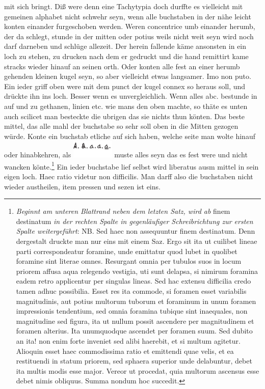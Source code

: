             \protect{} mit sich bringt. Diß were denn eine Tachytypia\protect{} doch durffte es vielleicht mit gemeinen alphabet nicht schwehr seyn, wenn alle buchstaben in der n\"{a}he leicht konten einander furgeschoben werden. Weren concentrice umb einander herumb, der da schlegt, stunde in der mitten oder potius weils nicht weit seyn wird noch darf darneben und schl\"{u}ge allezeit. Der herein fallende k\"{a}me ansonsten in ein loch zu stehen, zu drucken nach dem er gedruckt und die hand remittirt kame stracks wieder hinauf an seinen orth. Oder konten alle fest an einer herumb gehenden kleinen kugel seyn, so aber vielleicht etwas langsamer. Imo non puto. Ein ieder griff oben were mit dem punct der kugel connex so heraus soll, und dr\"{u}ckte ihn ins loch. Besser wenn es unvergleichlich. Wenn alles abc. bestunde in auf und zu gethanen, linien etc. wie mans den oben machte, so th\"{a}te es unten auch scilicet man besteckte die ubrigen das sie nichts thun k\"{o}nten. Das beste mittel, das alle mahl der buchstabe so sehr soll oben in die Mitten gezogen w\"{u}rde. Konte ein buchstab  etliche auf sich haben, welche seite man wolte hinauf oder hinabkehren, als \includegraphics[width=0.15\textwidth]{images/38_197r} muste alles seyn das es fest were und nicht wancken k\"{o}nte.\footnote{\textit{Beginnt am unteren Blattrand neben dem letzten Satz, wird ab} finem destinatum \textit{in der rechten Spalte in gegenl\"{a}ufiger Schreibrichtung zur ersten Spalte weitergef\"{u}hrt}: NB. Sed haec non assequuntur finem destinatum. Denn dergestalt druckte man nur eins mit einem Saz. Ergo sit ita ut cuilibet lineae parti correspondeatur foramine, unde emittatur quod lubet in quolibet foramine sint literae omnes. Resurgant omnia per tubulos suos in locum priorem affusa aqua relegendo vestigia, uti sunt delapsa, si nimirum foramina eadem retro applicentur per singulas lineas. Sed hac extensu difficilia credo tamen adhuc possibilia. Esset res ita commode, si foramen esset variabilis magnitudinis, aut potius multorum tuborum et foraminum in unum foramen impressionis tendentium, sed omnia foramina tubique sint inaequales, non magnitudine sed figura, ita ut nullum possit ascendere per magnitudinem et foramen alterius. Ita unumquodque ascendet per foramen suum. Sed dubito an ita! non enim forte inveniet sed alibi haerebit, et si multum agitetur. Alioquin esset haec commodissima ratio et emittendi quae velis, et ea restituendi in statum priorem, sed sphaera superior unde delabuntur, debet ita multis modis esse major. Vereor ut procedat, quia multorum ascensus esse debet nimis obliquus. Summa nondum hoc succedit.} Ein ieder buchstabe lief selbst wird liberatus ausm mittel in sein eigen loch. Haec ratio videtur non difficilis. Man darff also die buchstaben nicht wieder austheilen, item pressen und sezen ist eins.
            \pend 